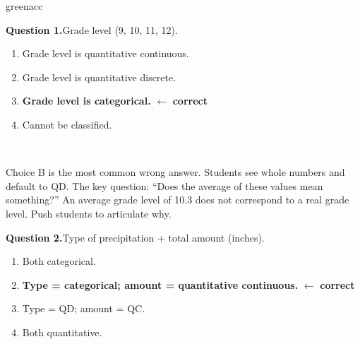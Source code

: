 \documentclass[10pt]{article}
\begin{document}
\begin{blurbbox}{greenacc}
\small

\textbf{Question 1.}\enspace Grade level (9, 10, 11, 12).\\[6pt]
\begin{enumerate}[label=\textbf{(\Alph*)}, leftmargin=2em, itemsep=3pt]
  \item Grade level is quantitative continuous.
  \item Grade level is quantitative discrete.
  \item \textbf{\textcolor{keyred}{Grade level is categorical.}} \textcolor{keyred}{$\leftarrow$ \textbf{correct}}
  \item Cannot be classified.
\end{enumerate}
\\[4pt]

\begin{teachernote}
Choice B is the most common wrong answer. Students see whole numbers and default to QD.
The key question: ``Does the average of these values mean something?'' An average grade
level of 10.3 does not correspond to a real grade level. Push students to articulate why.
\end{teachernote}

\vspace{10pt}
\textbf{Question 2.}\enspace Type of precipitation + total amount (inches).\\[6pt]
\begin{enumerate}[label=\textbf{(\Alph*)}, leftmargin=2em, itemsep=3pt]
  \item Both categorical.
  \item \textbf{\textcolor{keyred}{Type = categorical; amount = quantitative continuous.}}
        \textcolor{keyred}{$\leftarrow$ \textbf{correct}}
  \item Type = QD; amount = QC.
  \item Both quantitative.
\end{enumerate}


\end{blurbbox}
\end{document}
